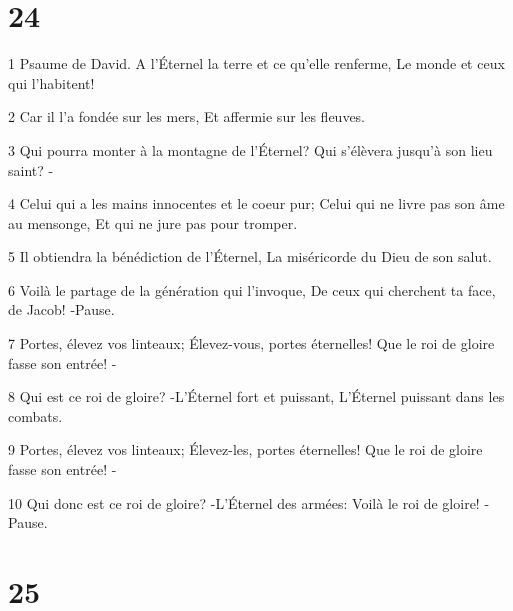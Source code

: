 \chapter{24}

\par 1 Psaume de David. A l'Éternel la terre et ce qu'elle renferme, Le monde et ceux qui l'habitent!
\par 2 Car il l'a fondée sur les mers, Et affermie sur les fleuves.
\par 3 Qui pourra monter à la montagne de l'Éternel? Qui s'élèvera jusqu'à son lieu saint? -
\par 4 Celui qui a les mains innocentes et le coeur pur; Celui qui ne livre pas son âme au mensonge, Et qui ne jure pas pour tromper.
\par 5 Il obtiendra la bénédiction de l'Éternel, La miséricorde du Dieu de son salut.
\par 6 Voilà le partage de la génération qui l'invoque, De ceux qui cherchent ta face, de Jacob! -Pause.
\par 7 Portes, élevez vos linteaux; Élevez-vous, portes éternelles! Que le roi de gloire fasse son entrée! -
\par 8 Qui est ce roi de gloire? -L'Éternel fort et puissant, L'Éternel puissant dans les combats.
\par 9 Portes, élevez vos linteaux; Élevez-les, portes éternelles! Que le roi de gloire fasse son entrée! -
\par 10 Qui donc est ce roi de gloire? -L'Éternel des armées: Voilà le roi de gloire! -Pause.

\chapter{25}

